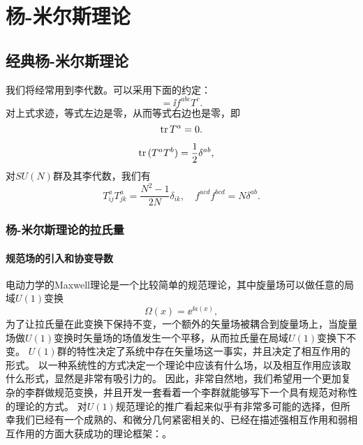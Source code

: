 \chapter{杨-米尔斯理论}

\section{经典杨-米尔斯理论}

我们将经常用到李代数。可以采用下面的约定： %
\begin{equation}
    [T^a, T^b] = \ii f^{abc} T^c.
\end{equation}
对上式求迹，等式左边是零，从而等式右边也是零，即
\begin{equation}
    \trace{T^a} = 0.
\end{equation}

\begin{equation}
    \trace{(T^a T^b)} = \frac{1}{2} \delta^{ab}, \quad 
\end{equation}
对$SU(N)$群及其李代数，我们有
\begin{equation}
    T^a_{ij} T^a_{jk} = \frac{N^2 - 1}{2N} \delta_{ik},\quad f^{acd} f^{bcd} = N \delta^{ab}.
\end{equation}

\subsection{杨-米尔斯理论的拉氏量}

\subsubsection{规范场的引入和协变导数}

电动力学的Maxwell理论是一个比较简单的规范理论，其中旋量场可以做任意的局域$U(1)$变换
\[
    \Omega(x) = \ee^{\ii a(x)},
\]
为了让拉氏量在此变换下保持不变，一个额外的矢量场被耦合到旋量场上，当旋量场做$U(1)$变换时矢量场的场值发生一个平移，从而拉氏量在局域$U(1)$变换下不变。
$U(1)$群的特性决定了系统中存在矢量场这一事实，并且决定了相互作用的形式。
以一种系统性的方式决定一个理论中应该有什么场，以及相互作用应该取什么形式，显然是非常有吸引力的。
因此，非常自然地，我们希望用一个更加复杂的李群做规范变换，并且开发一套看着一个李群就能够写下一个具有规范对称性的理论的方式。
对$U(1)$规范理论的推广看起来似乎有非常多可能的选择，但所幸我们已经有一个成熟的、和微分几何紧密相关的、已经在描述强相互作用和弱相互作用的方面大获成功的理论框架：。

